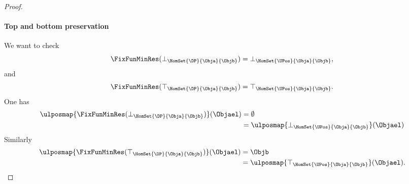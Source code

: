 \begin{proof}
    \paragraph*{Top and bottom preservation}
    We want to check
    \begin{equation*}
        \FixFunMinRes(\bot_{\HomSet{\DP}{\Obja}{\Objb}})=\bot_{\HomSet{\UPos}{\Obja}{\Objb}},
    \end{equation*}
    and
    \begin{equation*}
        \FixFunMinRes(\top_{\HomSet{\DP}{\Obja}{\Objb}})=\top_{\HomSet{\UPos}{\Obja}{\Objb}}.
    \end{equation*}
    One has
    \begin{equation*}
    \begin{aligned}
        \ulposmap{\FixFunMinRes(\bot_{\HomSet{\DP}{\Obja}{\Objb}})}(\Objael)&=\emptyset\\
        &=\ulposmap{\bot_{\HomSet{\UPos}{\Obja}{\Objb}}}(\Objael)
    \end{aligned}
    \end{equation*}
    Similarly
    \begin{equation*}
    \begin{aligned}
        \ulposmap{\FixFunMinRes(\top_{\HomSet{\DP}{\Obja}{\Objb}})}(\Objael)&=\Objb\\
        &=\ulposmap{\top_{\HomSet{\UPos}{\Obja}{\Objb}}}(\Objael).
    \end{aligned}
    \end{equation*}
\end{proof}

